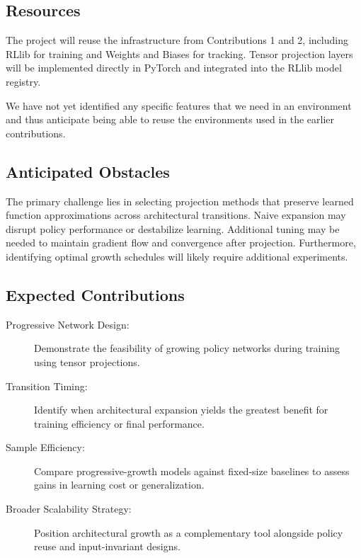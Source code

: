 \subsection{Resources}
The project will reuse the infrastructure from Contributions 1 and 2, 
including RLlib for training and Weights and Biases for tracking. 
Tensor projection layers will be implemented directly in PyTorch and 
integrated into the RLlib model registry.

We have not yet identified any specific features that we need in an environment
and thus anticipate being able to reuse the environments used in the 
earlier contributions.

\subsection{Anticipated Obstacles}
The primary challenge lies in selecting projection methods that preserve 
learned function approximations across architectural transitions. 
Naive expansion may disrupt policy performance or destabilize learning. 
Additional tuning may be needed to maintain gradient flow and convergence 
after projection. Furthermore, identifying optimal growth schedules will 
likely require additional experiments.

\subsection{Expected Contributions}
\begin{description}
    \item[Progressive Network Design:] Demonstrate the feasibility of growing 
        policy networks during training using tensor projections.
    \item[Transition Timing:] Identify when architectural expansion yields the 
        greatest benefit for training efficiency or final performance.
    \item[Sample Efficiency:] Compare progressive-growth models against fixed-size 
        baselines to assess gains in learning cost or generalization.
    \item[Broader Scalability Strategy:] Position architectural growth as a 
        complementary tool alongside policy reuse and input-invariant designs.
\end{description}
